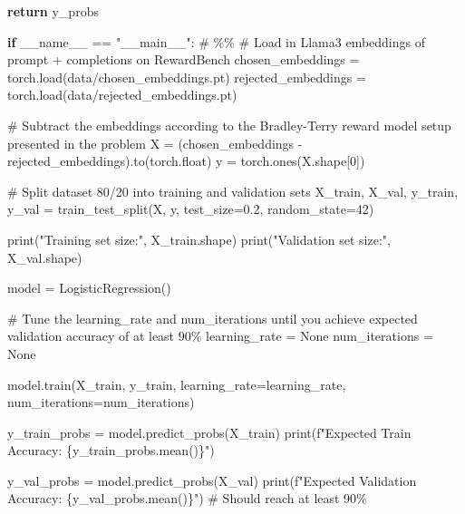\documentclass[
  letterpaper,
  DIV=11,
  numbers=noendperiod,
  oneside]{scrreprt}
\newenvironment{Shaded}{\begin{snugshade}}{\end{snugshade}}
\newcommand{\BuiltInTok}[1]{\textcolor[rgb]{0.00,0.23,0.31}{#1}}
\newcommand{\CommentTok}[1]{\textcolor[rgb]{0.37,0.37,0.37}{#1}}
\newcommand{\ControlFlowTok}[1]{\textcolor[rgb]{0.00,0.23,0.31}{\textbf{#1}}}
\newcommand{\DecValTok}[1]{\textcolor[rgb]{0.68,0.00,0.00}{#1}}
\newcommand{\FloatTok}[1]{\textcolor[rgb]{0.68,0.00,0.00}{#1}}
\newcommand{\NormalTok}[1]{\textcolor[rgb]{0.00,0.23,0.31}{#1}}
\newcommand{\OperatorTok}[1]{\textcolor[rgb]{0.37,0.37,0.37}{#1}}
\newcommand{\SpecialCharTok}[1]{\textcolor[rgb]{0.37,0.37,0.37}{#1}}
\newcommand{\SpecialStringTok}[1]{\textcolor[rgb]{0.13,0.47,0.30}{#1}}
\newcommand{\StringTok}[1]{\textcolor[rgb]{0.13,0.47,0.30}{#1}}
\newcommand{\VariableTok}[1]{\textcolor[rgb]{0.07,0.07,0.07}{#1}}
\theoremstyle{remark}
\begin{document}
\begin{Shaded}
\begin{Highlighting}[]
        \ControlFlowTok{return}\NormalTok{ y\_probs}


\ControlFlowTok{if} \VariableTok{\_\_name\_\_} \OperatorTok{==} \StringTok{"\_\_main\_\_"}\NormalTok{:}
    \CommentTok{\# \%\%}
    \CommentTok{\# Load in Llama3 embeddings of prompt + completions on RewardBench}
\NormalTok{    chosen\_embeddings }\OperatorTok{=}\NormalTok{ torch.load(}\StringTok{\textquotesingle{}data/chosen\_embeddings.pt\textquotesingle{}}\NormalTok{)}
\NormalTok{    rejected\_embeddings }\OperatorTok{=}\NormalTok{ torch.load(}\StringTok{\textquotesingle{}data/rejected\_embeddings.pt\textquotesingle{}}\NormalTok{)}

    \CommentTok{\# Subtract the embeddings according to the Bradley{-}Terry reward model setup presented in the problem }
\NormalTok{    X }\OperatorTok{=}\NormalTok{ (chosen\_embeddings }\OperatorTok{{-}}\NormalTok{ rejected\_embeddings).to(torch.}\BuiltInTok{float}\NormalTok{)}
\NormalTok{    y }\OperatorTok{=}\NormalTok{ torch.ones(X.shape[}\DecValTok{0}\NormalTok{])}

    \CommentTok{\# Split dataset 80/20 into training and validation sets}
\NormalTok{    X\_train, X\_val, y\_train, y\_val }\OperatorTok{=}\NormalTok{ train\_test\_split(X, y, test\_size}\OperatorTok{=}\FloatTok{0.2}\NormalTok{, random\_state}\OperatorTok{=}\DecValTok{42}\NormalTok{)  }

    \BuiltInTok{print}\NormalTok{(}\StringTok{"Training set size:"}\NormalTok{, X\_train.shape)}
    \BuiltInTok{print}\NormalTok{(}\StringTok{"Validation set size:"}\NormalTok{, X\_val.shape)}

\NormalTok{    model }\OperatorTok{=}\NormalTok{ LogisticRegression()}

    \CommentTok{\# Tune the learning\_rate and num\_iterations until you achieve expected validation accuracy of at least 90\%}
\NormalTok{    learning\_rate }\OperatorTok{=} \VariableTok{None}
\NormalTok{    num\_iterations }\OperatorTok{=} \VariableTok{None}

\NormalTok{    model.train(X\_train, y\_train, learning\_rate}\OperatorTok{=}\NormalTok{learning\_rate, num\_iterations}\OperatorTok{=}\NormalTok{num\_iterations)}

\NormalTok{    y\_train\_probs }\OperatorTok{=}\NormalTok{ model.predict\_probs(X\_train)}
    \BuiltInTok{print}\NormalTok{(}\SpecialStringTok{f"Expected Train Accuracy: }\SpecialCharTok{\{}\NormalTok{y\_train\_probs}\SpecialCharTok{.}\NormalTok{mean()}\SpecialCharTok{\}}\SpecialStringTok{"}\NormalTok{)}

\NormalTok{    y\_val\_probs }\OperatorTok{=}\NormalTok{ model.predict\_probs(X\_val)}
    \BuiltInTok{print}\NormalTok{(}\SpecialStringTok{f"Expected Validation Accuracy: }\SpecialCharTok{\{}\NormalTok{y\_val\_probs}\SpecialCharTok{.}\NormalTok{mean()}\SpecialCharTok{\}}\SpecialStringTok{"}\NormalTok{) }\CommentTok{\# Should reach at least 90\%}
\end{Highlighting}
\end{Shaded}
\end{document}
